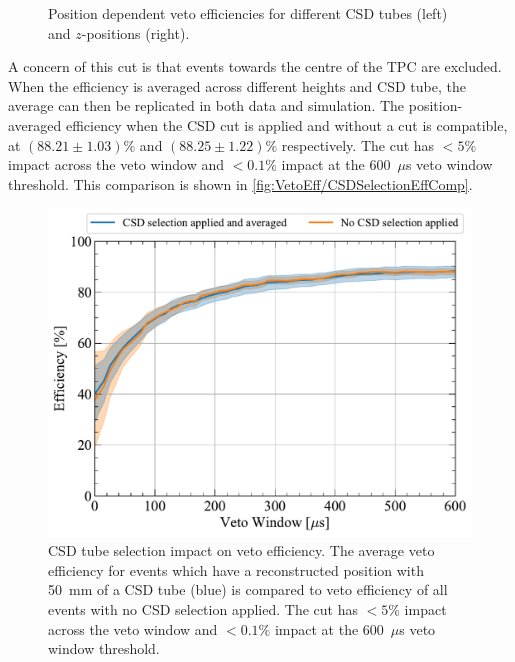 \begin{enumerate}
\begin{figure}[!ht]
\begin{subfigure}[b]{0.49\textwidth}
            \caption{}
    		\label{fig:VetoEff/VetoEffPositionDependenceCSD}
    	\end{subfigure}
    	\caption{Position dependent veto efficiencies for different CSD tubes (left) and $z$-positions (right).}
    	\label{fig:VetoEff/VetoEffPositionDependence}
    \end{figure}
	A concern of this cut is that events towards the centre of the TPC are excluded. When the efficiency is averaged across different heights and CSD tube, the average can then be replicated in both data and simulation. 
    The position-averaged efficiency when the CSD cut is applied and without a cut is compatible, at  $(88.21\pm1.03)\%$ and $(88.25\pm1.22)\%$ respectively.
	The cut has $<5\%$ impact across the veto window and $<0.1\%$ impact at the 600~$\mu$s veto window threshold. This comparison is shown in \autoref{fig:VetoEff/CSDSelectionEffComp}.
    \begin{figure}[!ht]
    	\centering
    	\includegraphics[width=0.7\linewidth]{figures/VetoEfficiency/CSDSelectionCheck.pdf}
    	\caption[CSD tube selection impact on veto efficiency.]{CSD tube selection impact on veto efficiency. The average veto efficiency for events which have a reconstructed position with 50~mm of a CSD tube (blue) is compared to veto efficiency of all events with no CSD selection applied. The cut has $<5\%$ impact across the veto window and $<0.1\%$ impact at the 600~$\mu$s veto window threshold.}
    	\label{fig:VetoEff/CSDSelectionEffComp}
    \end{figure}


\end{enumerate}

